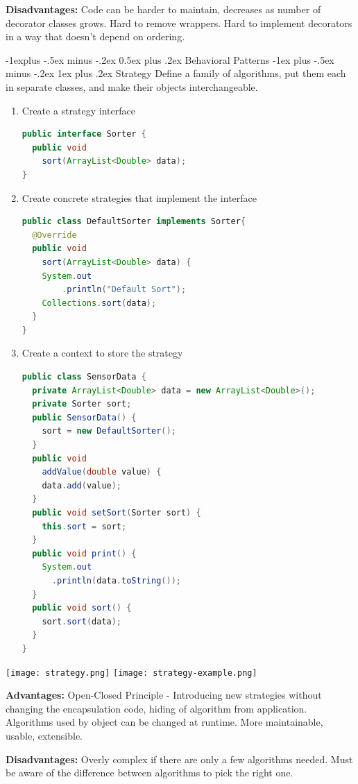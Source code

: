 \documentclass[letterpaper, 8pt]{extarticle}
\makeatletter
\renewcommand{\subsection}{\@startsection{subsection}{2}{0mm}%
                                {-1explus -.5ex minus -.2ex}%
                                {0.5ex plus .2ex}%
                                {\normalfont\small\bfseries}}
\renewcommand{\subsubsection}{\@startsection{subsubsection}{3}{0mm}%
                                {-1ex plus -.5ex minus -.2ex}%
                                {1ex plus .2ex}%
                                {\normalfont\tiny\bfseries}}
\makeatother
\begin{document}
\begin{multicols*}{6}
    \textbf{Disadvantages:}
    Code can be harder to maintain, decreases as number of decorator classes grows.
    Hard to remove wrappers.
    Hard to implement decorators in a way that doesn't depend on ordering.


    \subsection{Behavioral Patterns}
    \subsubsection{Strategy}
    Define a family of algorithms, put them each in separate classes,
    and make their objects interchangeable.
    \begin{enumerate}
        \item Create a strategy interface
        \begin{lstlisting}[language=Java, breaklines=true]
public interface Sorter {
  public void 
    sort(ArrayList<Double> data);
}
        \end{lstlisting}
        \item Create concrete strategies that implement the interface
        \begin{lstlisting}[language=Java, breaklines=true]
public class DefaultSorter implements Sorter{
  @Override
  public void 
    sort(ArrayList<Double> data) {
    System.out
        .println("Default Sort");
    Collections.sort(data);
  }
}
        \end{lstlisting}
        \item Create a context to store the strategy 
        \begin{lstlisting}[language=Java, breaklines=true]
public class SensorData {
  private ArrayList<Double> data = new ArrayList<Double>();
  private Sorter sort;
  public SensorData() {
  	sort = new DefaultSorter();
  }
  public void 
    addValue(double value) {
  	data.add(value);
  }
  public void setSort(Sorter sort) {
  	this.sort = sort;
  }
  public void print() {
  	System.out
      .println(data.toString());
  }
  public void sort() {
  	sort.sort(data);
  }
}

        \end{lstlisting}
    \end{enumerate}
    \begin{center}
        \texttt{[image: strategy.png]}
        \texttt{[image: strategy-example.png]}
    \end{center}

    \textbf{Advantages:}
    Open-Closed Principle - Introducing new strategies without changing the encapsulation code,
    hiding of algorithm from application.
    Algorithms used by object can be changed at runtime.
    More maintainable, usable, extensible.

    \textbf{Disadvantages:}
    Overly complex if there are only a few algorithms needed.
    Must be aware of the difference between algorithms to pick the right one.

\end{multicols*}
\end{document}
